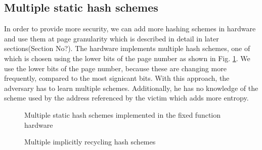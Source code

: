 \subsection{Multiple static hash schemes}
In order to provide more security, we can add more hashing schemes in hardware and use them at page granularity which is described in detail in later sections(Section No?). The hardware implements multiple hash schemes, one of which is chosen using the lower bits of the page number as shown in Fig. \ref{figure:multiple_schemes}. We use the lower bits of the page number, because these are changing more frequently, compared to the most signicant bits. With this approach, the adversary has to learn multiple schemes. Additionally, he has no knowledge of the scheme used by the address referenced by the victim which adds more entropy.

\begin{figure}
  \caption{Multiple static hash schemes implemented in the fixed function hardware}
  \label{figure:multiple_schemes}
\end{figure}

\begin{figure}
  \caption{Multiple implicitly recycling hash schemes}
  \label{figure:changing_schemes}
\end{figure}

